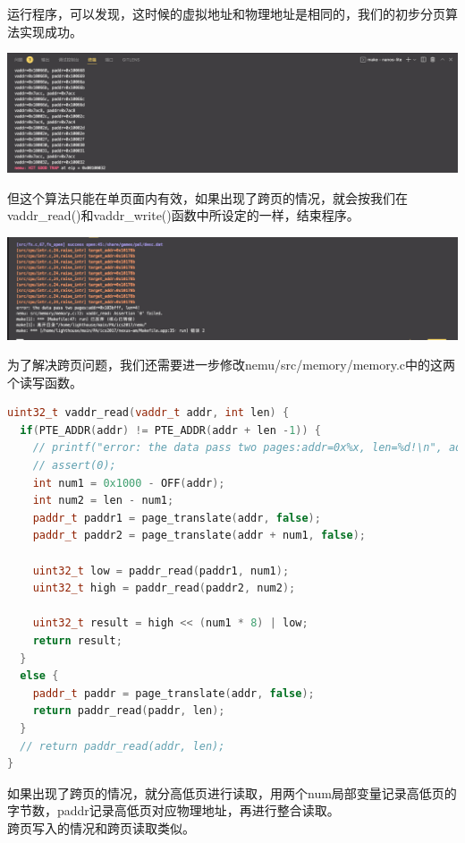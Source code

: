 \documentclass[UTF8,a4paper,10pt]{ctexart}
\begin{document}
运行程序，可以发现，这时候的虚拟地址和物理地址是相同的，我们的初步分页算法实现成功。

\begin{center}
  \includegraphics*[scale = 0.28]{img/4}
\end{center}
但这个算法只能在单页面内有效，如果出现了跨页的情况，就会按我们在vaddr\_read()和vaddr\_write()函数中所设定的一样，结束程序。
\begin{center}
  \includegraphics*[scale = 0.28]{img/5}
\end{center}
为了解决跨页问题，我们还需要进一步修改nemu/src/memory/memory.c中的这两个读写函数。
\begin{lstlisting}[language = C++]
uint32_t vaddr_read(vaddr_t addr, int len) {
  if(PTE_ADDR(addr) != PTE_ADDR(addr + len -1)) {
    // printf("error: the data pass two pages:addr=0x%x, len=%d!\n", addr, len);
    // assert(0);
    int num1 = 0x1000 - OFF(addr);
    int num2 = len - num1;
    paddr_t paddr1 = page_translate(addr, false);
    paddr_t paddr2 = page_translate(addr + num1, false);

    uint32_t low = paddr_read(paddr1, num1);
    uint32_t high = paddr_read(paddr2, num2);

    uint32_t result = high << (num1 * 8) | low;
    return result;
  }
  else {
    paddr_t paddr = page_translate(addr, false);
    return paddr_read(paddr, len);
  }
  // return paddr_read(addr, len);
}
\end{lstlisting}
如果出现了跨页的情况，就分高低页进行读取，用两个num局部变量记录高低页的字节数，paddr记录高低页对应物理地址，再进行整合读取。\\
跨页写入的情况和跨页读取类似。
\end{document}
